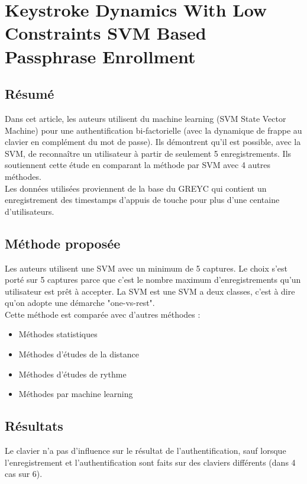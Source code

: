 \section{Keystroke Dynamics With Low Constraints SVM Based Passphrase Enrollment\cite{giotSVM}}

\subsection{Résumé}

Dans cet article, les auteurs utilisent du machine learning (SVM State Vector Machine) pour une authentification bi-factorielle (avec la dynamique de frappe au clavier en complément du mot de passe). Ils démontrent qu'il est possible, avec la SVM, de reconnaître un utilisateur à partir de seulement 5 enregistrements. Ils soutiennent cette étude en comparant la méthode par SVM avec 4 autres méthodes.\\

Les données utilisées proviennent de la base du GREYC qui contient un enregistrement des timestamps d'appuis de touche pour plus d'une centaine d'utilisateurs.

\subsection{Méthode proposée}

Les auteurs utilisent une SVM avec un minimum de 5 captures. Le choix s'est porté sur 5 captures parce que c'est le nombre maximum d'enregistrements qu'un utilisateur est prêt à accepter. La SVM est une SVM a deux classes, c'est à dire qu'on adopte une démarche "one-vs-rest".\\

Cette méthode est comparée avec d'autres méthodes :

\begin{itemize}
  \item Méthodes statistiques
  \item Méthodes d'études de la distance
  \item Méthodes d'études de rythme
  \item Méthodes par machine learning
\end{itemize}

\subsection{Résultats}

Le clavier n'a pas d'influence sur le résultat de l'authentification, sauf lorsque l'enregistrement et l'authentification sont faits sur des claviers différents (dans 4 cas sur 6).\\

